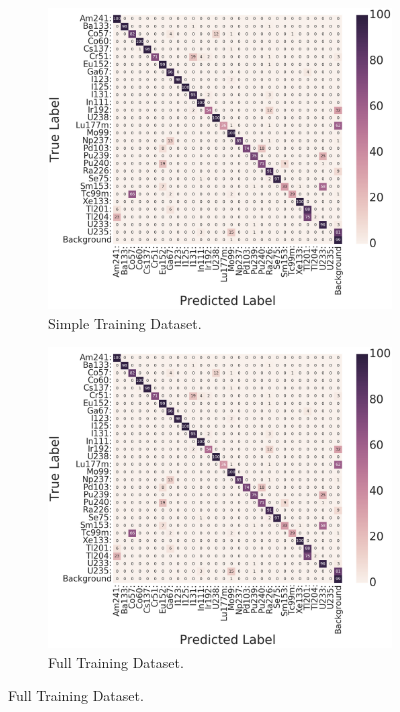 \begin{figure}[H]
     \centering
     \begin{subfigure}[b]{0.49\textwidth}
         \centering
         \includegraphics[width=\textwidth]{model_choice_hyperparameter_search_images/conf_matrix_example.png}
         \caption{Simple Training Dataset.}
         \label{fig:results_easy_distance_comparison_simple}
     \end{subfigure}
     \hfill
     \begin{subfigure}[b]{0.49\textwidth}
         \centering
         \includegraphics[width=\textwidth]{model_choice_hyperparameter_search_images/conf_matrix_example.png}
         \caption{Full Training Dataset.}
         \label{fig:results_easy_distance_comparison_full}
     \end{subfigure}
     

\end{figure}
